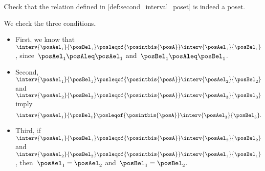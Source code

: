 \begin{exercise}
    Check that the relation defined in \cref{def:second_interval_poset} is indeed a poset.
\end{exercise}
\begin{solution}
    We check the three conditions.
    \begin{itemize}
        \item First, we know that~$\interv{\posAel_1}{\posBel_1}\posleqof{\posintbis{\posA}}\interv{\posAel_1}{\posBel_1}$, since~$\posAel_1\posAleq \posAel_1$ and~$\posBel_1\posAleq \posBel_1$.
        \item Second,~$\interv{\posAel_1}{\posBel_1}\posleqof{\posintbis{\posA}}\interv{\posAel_2}{\posBel_2}$ and~$\interv{\posAel_2}{\posBel_2}\posleqof{\posintbis{\posA}}\interv{\posAel_3}{\posBel_3}$ imply
              \begin{equation}
                  \interv{\posAel_1}{\posBel_1}\posleqof{\posintbis{\posA}}\interv{\posAel_3}{\posBel_3}.
              \end{equation}
        \item Third, if~$\interv{\posAel_1}{\posBel_1}\posleqof{\posintbis{\posA}}\interv{\posAel_2}{\posBel_2}$ and~$\interv{\posAel_2}{\posBel_2}\posleqof{\posintbis{\posA}}\interv{\posAel_1}{\posBel_1}$, then~$\posAel_1=\posAel_2$ and~$\posBel_1=\posBel_2$.
    \end{itemize}
\end{solution}